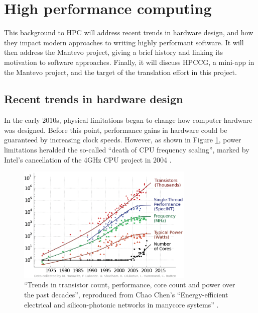 \section{High performance computing}
\label{sec:hpc}

This background to \acrshort{HPC} will address recent trends in hardware design, and how they impact modern approaches to writing highly performant software. It will then address the Mantevo project, giving a brief history and linking its motivation to software approaches. Finally, it will discuss \acrshort{HPCCG}, a \acrshort{mini-app} in the Mantevo project, and the target of the translation effort in this project.

\subsection{Recent trends in hardware design}
\label{ssec:hardware-design-trends}

In the early 2010s, physical limitations began to change how computer hardware was designed. Before this point, performance gains in hardware could be guaranteed by increasing clock speeds. However, as shown in Figure \ref{fig:scaling-trends-transistor-clock}, power limitations heralded the so-called ``death of CPU frequency scaling'', marked by Intel's cancellation of the 4GHz CPU project in 2004 \cite{markovLimitsFundamentalLimits2014}.

\begin{figure}[H]
    \centering
    \includegraphics[width=0.75\textwidth]{images/2_background/1-Trends-in-transistor-count-performance-core-count-and-power-over-the-past-decades.png}
    \caption{``Trends in transistor count, performance, core count and power over the past decades'', reproduced from Chao Chen's ``Energy-efficient electrical and silicon-photonic networks in manycore systems'' \cite{chenEnergyefficientElectricalSiliconphotonic2014}.}
    \label{fig:scaling-trends-transistor-clock}
\end{figure}

